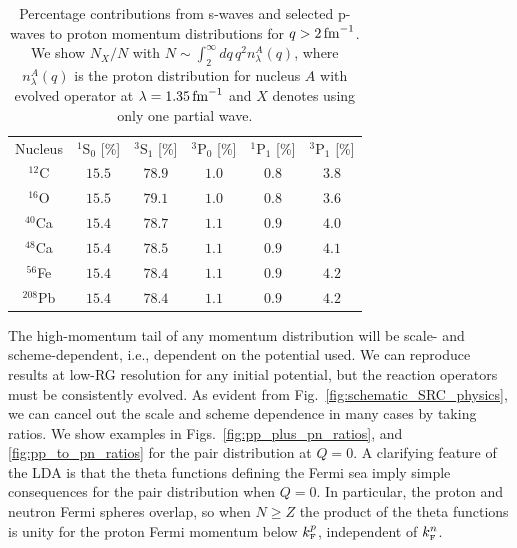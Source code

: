 \documentclass[10pt,aps,prc,floatfix,twocolumn,nofootinbib]{revtex4-1}
\begin{document}
\begin{table}[htb]
	\caption{Percentage contributions from s-waves and selected p-waves to proton momentum distributions for $q>2\,\mbox{fm}^{-1}$. We show $N_X/N$ with $N \sim \int_2^{\infty} dq\, q^2 n_{\lambda}^A(q)$, where $n_{\lambda}^A(q)$ is the proton distribution for nucleus $A$ with evolved operator at $\lambda = 1.35\,\mbox{fm}^{-1}$ and $X$ denotes using only one partial wave.}
	\label{tab:partial_wave_contributions}
	\begin{ruledtabular}
		\begin{tabular}{c|ccccc}
		   Nucleus & $^{1}$S$_0$ [\%] & $^{3}$S$_1$ [\%] & $^{3}$P$_0$ [\%] & $^{1}$P$_1$ [\%] & $^{3}$P$_1$ [\%]
		   \mystrut\\
			\colrule
      			$^{12}$C & $15.5$ & $78.9$ & $1.0$ &
      			$0.8$ & $3.8$
                    \mystrut\\
      			$^{16}$O & $15.5$ & $79.1$ & $1.0$ &
      			$0.8$ & $3.6$
                    \mystrut\\
      			$^{40}$Ca & $15.4$ & $78.7$ & $1.1$ &
      			$0.9$ & $4.0$
                    \mystrut\\
      			$^{48}$Ca & $15.4$ & $78.5$ & $1.1$ &
      			$0.9$ & $4.1$
                    \mystrut\\
      			$^{56}$Fe & $15.4$ & $78.4$ & $1.1$ &
      			$0.9$ & $4.2$
                    \mystrut\\
      			$^{208}$Pb & $15.4$ & $78.4$ & $1.1$ &
      			$0.9$ & $4.2$
                    \mystrut
		\end{tabular}
  	\end{ruledtabular}
\end{table}

The high-momentum tail of any momentum distribution will be scale- and scheme-dependent, i.e., dependent on the potential used. 
We can reproduce results at low-RG resolution for any initial potential, but the reaction operators must be consistently evolved.
As evident from Fig.~\ref{fig:schematic_SRC_physics}, we can cancel out the scale and scheme dependence in many cases by taking ratios.
We show examples in Figs.~\ref{fig:pp_plus_pn_ratios}, and \ref{fig:pp_to_pn_ratios} for the pair distribution at $Q=0$.
A clarifying feature of the LDA is that the theta functions defining the Fermi sea imply simple consequences for the pair distribution when $Q=0$.
In particular, the proton and neutron Fermi spheres overlap, so when $N \geq Z$ the product of the theta functions  is unity for the proton Fermi momentum below $k_{\scriptscriptstyle{\text F}}^p$, independent of $k_{\scriptscriptstyle{\text F}}^n$.
\end{document}
